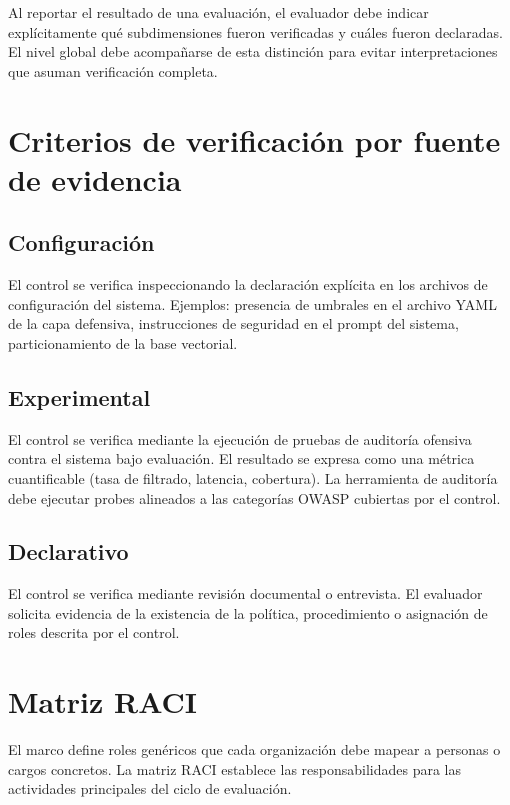 Al reportar el resultado de una evaluación, el evaluador debe indicar explícitamente qué subdimensiones fueron verificadas y cuáles fueron declaradas. El nivel global debe acompañarse de esta distinción para evitar interpretaciones que asuman verificación completa.


\section{Criterios de verificación por fuente de evidencia}
\label{sec:criterios-verificacion}

\subsection{Configuración}

El control se verifica inspeccionando la declaración explícita en los archivos de configuración del sistema. Ejemplos: presencia de umbrales en el archivo YAML de la capa defensiva, instrucciones de seguridad en el prompt del sistema, particionamiento de la base vectorial.

\subsection{Experimental}

El control se verifica mediante la ejecución de pruebas de auditoría ofensiva contra el sistema bajo evaluación. El resultado se expresa como una métrica cuantificable (tasa de filtrado, latencia, cobertura). La herramienta de auditoría debe ejecutar probes alineados a las categorías OWASP cubiertas por el control.

\subsection{Declarativo}

El control se verifica mediante revisión documental o entrevista. El evaluador solicita evidencia de la existencia de la política, procedimiento o asignación de roles descrita por el control.


\section{Matriz RACI}
\label{sec:raci}

El marco define roles genéricos que cada organización debe mapear a personas o cargos concretos. La matriz RACI establece las responsabilidades para las actividades principales del ciclo de evaluación.

